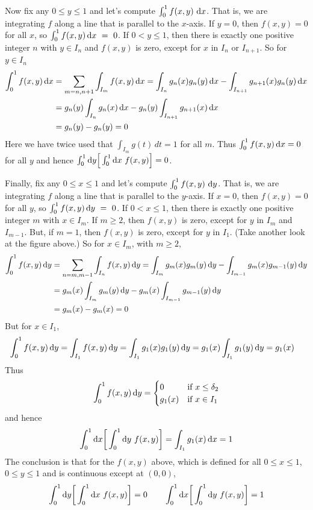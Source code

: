 \begin{eg}
Now fix any $0\le y\le 1$ and let's compute $\int_0^1 f(x,y)\ \dee{x}$.
That is, we are integrating $f$ along a line that is parallel to the $x$-axis.
If $y=0$, then $f(x,y)=0$ for all $x$, so $\int_0^1 f(x,y)\,\mathrm{d}x~=~0$.
If $0<y\le 1$, then there is exactly one positive integer $n$ with 
$y\in I_n$ and $f(x,y)$ is zero, except for $x$ in $I_n$ or $I_{n+1}$. 
So for $y\in I_n$
\begin{align*}
\int_0^1 f(x,y)\,\mathrm{d}x&=\sum_{m=n,n+1}\int_{I_m} f(x,y)\,\mathrm{d}x
=\int_{I_n} g_n(x)g_n(y)\,\mathrm{d}x-\int_{I_{n+1}} g_{n+1}(x)g_n(y)\,\mathrm{d}x \\
&=g_n(y)\int_{I_n} g_n(x)\,\mathrm{d}x-g_n(y)\int_{I_{n+1}} g_{n+1}(x)\,\mathrm{d}x \\
&=g_n(y)-g_n(y)=0
\end{align*}
Here we have twice used that $\int_{I_m}g(t)\,dt=1$ for all $m$. Thus
$\int_0^1 f(x,y)\,\mathrm{d}x=0$ for all $y$ and hence $\int_0^1\mathrm{d}y\Big[\int_0^1
\mathrm{d}x\ f(x,y)\Big]=0$.

Finally, fix any $0\le x\le 1$ and let's compute $\int_0^1 f(x,y)\ \dee{y}$.
That is, we are integrating $f$ along a line that is parallel to the $y$-axis.
If $x=0$, then $f(x,y)=0$ for all $y$, so $\int_0^1 f(x,y)\,\mathrm{d}y~=~0$.
If $0<x\le 1$, then there is exactly one positive integer $m$ with 
$x\in I_m$. If $m\ge 2$, then $f(x,y)$ is zero, except for $y$ in $I_m$ and 
$I_{m-1}$. But, if $m=1$, then $f(x,y)$ is zero, except for $y$ in $I_1$.
(Take another look at the figure above.) 
So for $x\in I_m$, with $m\ge 2$,
\begin{align*}
\int_0^1 f(x,y)\,\mathrm{d}y&=\sum_{n=m,m-1}\int_{I_n} f(x,y)\,\mathrm{d}y
=\int_{I_m} g_m(x)g_m(y)\,\mathrm{d}y-\int_{I_{m-1}} g_{m}(x)g_{m-1}(y)\,\mathrm{d}y \\
&=g_m(x)\int_{I_m} g_m(y)\,\mathrm{d}y-g_m(x)\int_{I_{m-1}} g_{m-1}(y)\,\mathrm{d}y \\
&=g_m(x)-g_m(x)=0
\end{align*}
But for $x\in I_1$,
\begin{align*}
\int_0^1 f(x,y)\,\mathrm{d}y&=\int_{I_1} f(x,y)\,\mathrm{d}y
=\int_{I_1} g_1(x)g_1(y)\,\mathrm{d}y
=g_1(x)\int_{I_1} g_1(y)\,\mathrm{d}y
=g_1(x)
\end{align*}
 Thus
\begin{equation*}
\int_0^1 f(x,y)\,\mathrm{d}y=\begin{cases}
                          0&\text{if $x\le \delta_2$} \\
                         g_1(x)&\text{if $x\in I_1$}
                          \end{cases}
\end{equation*}
and hence
\begin{equation*}
\int_0^1\dee{x}\bigg[\int_0^1 \dee{y}\ f(x,y)\bigg]
=\int_{I_1}g_1(x)\,\dee{x}=1
\end{equation*}
The conclusion is that for the $f(x,y)$ above, which is defined 
for all $0\le x\le 1$, $0\le y\le 1$ and is continuous except at $(0,0)$,
\begin{equation*}
\int_0^1\dee{y}\bigg[\int_0^1 \dee{x}\ f(x,y)\bigg]=0
\qquad
\int_0^1\dee{x}\bigg[\int_0^1 \dee{y}\ f(x,y)\bigg]=1
\end{equation*}
\end{eg}

